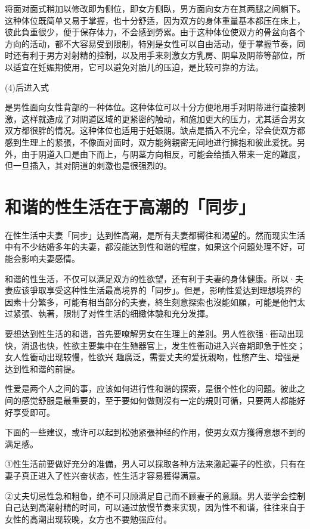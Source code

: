 \documentclass[12pt,UTF8]{ctexbook}
\begin{document}
将面对面式稍加以修改即为侧位，即女方侧臥，男方面向女方在其两腿之间躺下。这种体位既简单又易于掌握，也十分舒适，因为双方的身体重量基本都压在床上，彼此負重很少，便于保存体力，不会感到勞累。由于这种体位使双方的骨盆向各个方向的活动，都不大容易受到限制，特別是女性可以自由活动，便于掌握节奏，同时还有利于男方对射精的控制，以及用手来刺激女方乳房、阴阜及阴蒂等部位，所以适宜在妊娠期使用，它可以避免对胎儿的压迫，是比较可靠的方法。

(4)后进入式

是男性面向女性背部的一种体位。这种体位可以十分方便地用手对阴蒂进行直接刺激，这样就造成了对阴道区域的更紧密的触动，和施加更大的压力，尤其适合男女双方都很胖的情况。这种体位也适用于妊娠期。缺点是插入不完全，常会使双方都感到生理上的紧張，不像面对面时，双方能夠親密无间地进行擁抱和彼此爱抚。另外，由于阴道入口是由下而上，与阴茎方向相反，可能会给插入带来一定的難度，但一旦插入，其对阴道的刺激也是很强烈的。

\section{和谐的性生活在于高潮的「同步」}

在性生活中夫妻「同步」达到性高潮，是所有夫妻都嚮往和渴望的。然而现实生活中有不少结婚多年的夫妻，都沒能达到性和谐的程度，如果这个问題处理不好，可能会影响夫妻感情。

和谐的性生活，不仅可以满足双方的性欲望，还有利于夫妻的身体健康。所以·夫妻应该爭取享受这种性生活最高境界的「同步」。但是，影响性爱达到理想境界的因素十分繁多，可能有相当部分的夫妻，終生刻意探索也沒能如願，可能是他們太过紧張、執著，限制了对性生活的细緻体驗和充分发揮。

要想达到性生活的和谐，首先要嘹解男女在生理上的差別。男人性欲强·衝动出现快，消退也快，性欲主要集中在生殖器官上，发生性衝动进入兴奋期即急于性交；女人性衝动出现较慢，性欲兴
趣廣泛，需要丈夫的爱抚親吻，性憋产生、增强是达到性和谐的前提。

性爱是两个人之间的事，应该如何进行性和谐的探索，是很个性化的问題。彼此之间的感觉舒服是最重要的，至于要如何做则沒有一定的規则可循，只要两人都能好好享受即可。

下面的一些建议，或许可以起到松弛紧張神经的作用，使男女双方獲得意想不到的满足感。

①性生活前要做好充分的准備，男人可以採取各种方法来激起妻子的性欲，只有在妻子真正进入了性兴奋状态，性生活才容易獲得满意。

②丈夫切忌性急和粗魯，绝不可只顾满足自己而不顾妻子的意願。男人要学会控制自己达到高潮射精的时间，可以通过放慢节奏来实现，因为性不和谐，往往来自于女性的高潮出现较晚，女方也不要勉强应付。
\end{document}
